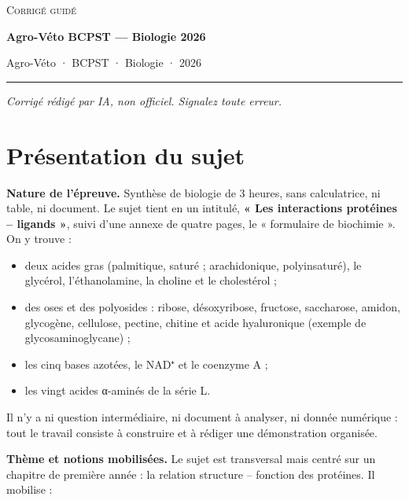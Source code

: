 \documentclass[11pt,a4paper]{article}
\providecommand{\tightlist}{\setlength{\itemsep}{0pt}\setlength{\parskip}{0pt}}
\begin{document}
\thispagestyle{plain}
\begin{center}
  {\small\scshape Corrigé guidé}\par\smallskip
  {\LARGE\bfseries Agro-Véto BCPST — Biologie 2026\par}\medskip
  {\large Agro-Véto · BCPST · Biologie · 2026\par}
\end{center}
\vspace{2pt}\hrule\vspace{8pt}

\emph{Corrigé rédigé par IA, non officiel. Signalez toute erreur.}

\hypertarget{pruxe9sentation-du-sujet}{%
\section{Présentation du sujet}\label{pruxe9sentation-du-sujet}}

\textbf{Nature de l'épreuve.} Synthèse de biologie de 3 heures, sans calculatrice, ni table, ni document. Le sujet tient en un intitulé, \textbf{« Les interactions protéines -- ligands »}, suivi d'une annexe de quatre pages, le « formulaire de biochimie ». On y trouve :

\begin{itemize}
\tightlist
\item
  deux acides gras (palmitique, saturé ; arachidonique, polyinsaturé), le glycérol, l'éthanolamine, la choline et le cholestérol ;
\item
  des oses et des polyosides : ribose, désoxyribose, fructose, saccharose, amidon, glycogène, cellulose, pectine, chitine et acide hyaluronique (exemple de glycosaminoglycane) ;
\item
  les cinq bases azotées, le NAD⁺ et le coenzyme A ;
\item
  les vingt acides α-aminés de la série L.
\end{itemize}

Il n'y a ni question intermédiaire, ni document à analyser, ni donnée numérique : tout le travail consiste à construire et à rédiger une démonstration organisée.

\textbf{Thème et notions mobilisées.} Le sujet est transversal mais centré sur un chapitre de première année : la relation structure -- fonction des protéines. Il mobilise :
\end{document}
